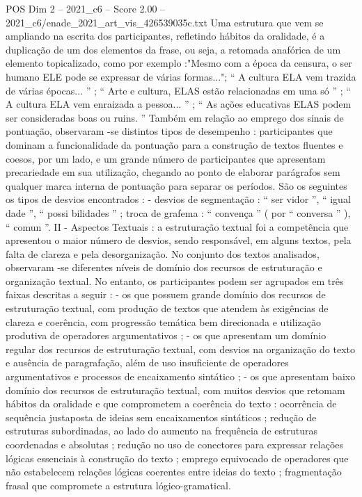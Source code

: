 \begin{textsample}{POS Dim 2 – 2021\_c6 – Score 2.00 – 2021\_c6/enade\_2021\_art\_vis\_426539035c.txt}
Uma estrutura que vem se ampliando na escrita dos participantes, refletindo hábitos da oralidade, é a duplicação de um dos elementos da frase, ou seja, a retomada anafórica de um elemento topicalizado, como por exemplo :"Mesmo com a época da censura, o ser humano ELE pode se expressar de várias formas..."; “ A cultura ELA vem trazida de várias épocas... ” ; “ Arte e cultura, ELAS estão relacionadas em uma só ” ; “ A cultura ELA vem enraizada a pessoa... ” ; “ As ações educativas ELAS podem ser consideradas boas ou ruins. ” Também em relação ao emprego dos sinais de pontuação, observaram -se distintos tipos de desempenho : participantes que dominam a funcionalidade da pontuação para a construção de textos fluentes e coesos, por um lado, e um grande número de participantes que apresentam precariedade em sua utilização, chegando ao ponto de elaborar parágrafos sem qualquer marca interna de pontuação para separar os períodos.
São os seguintes os tipos de desvios encontrados : - desvios de segmentação : “ ser vidor ”, “ igual dade ”, “ possi bilidades ” ; troca de grafema : “ convença ” ( por “ conversa ” ), “ comun ”.
II - Aspectos Textuais : a estruturação textual foi a competência que apresentou o maior número de desvios, sendo responsável, em alguns textos, pela falta de clareza e pela desorganização.
No conjunto dos textos analisados, observaram -se diferentes níveis de domínio dos recursos de estruturação e organização textual.
No entanto, os participantes podem ser agrupados em três faixas descritas a seguir : - os que possuem grande domínio dos recursos de estruturação textual, com produção de textos que atendem às exigências de clareza e coerência, com progressão temática bem direcionada e utilização produtiva de operadores argumentativos ; - os que apresentam um domínio regular dos recursos de estruturação textual, com desvios na organização do texto e ausência de paragrafação, além de uso insuficiente de operadores argumentativos e processos de encaixamento sintático ; - os que apresentam baixo domínio dos recursos de estruturação textual, com muitos desvios que retomam hábitos da oralidade e que comprometem a coerência do texto : ocorrência de sequência justaposta de ideias sem encaixamentos sintáticos ; redução de estruturas subordinadas, ao lado do aumento na frequência de estruturas coordenadas e absolutas ; redução no uso de conectores para expressar relações lógicas essenciais à construção do texto ; emprego equivocado de operadores que não estabelecem relações lógicas coerentes entre ideias do texto ; fragmentação frasal que compromete a estrutura lógico-gramatical.

\end{textsample}
